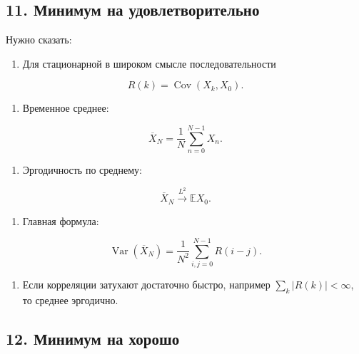 \documentclass[
  11pt,
  a4paper,
]{article}
\providecommand{\tightlist}{%
  \setlength{\itemsep}{0pt}\setlength{\parskip}{0pt}}
\begin{document}
\subsection{11. Минимум на
удовлетворительно}\label{ux43cux438ux43dux438ux43cux443ux43c-ux43dux430-ux443ux434ux43eux432ux43bux435ux442ux432ux43eux440ux438ux442ux435ux43bux44cux43dux43e}

Нужно сказать:

\begin{enumerate}
\def\labelenumi{\arabic{enumi}.}
\tightlist
\item
  Для стационарной в широком смысле последовательности
\end{enumerate}

\[
R(k)=\operatorname{Cov}(X_k,X_0).
\]

\begin{enumerate}
\def\labelenumi{\arabic{enumi}.}
\setcounter{enumi}{1}
\tightlist
\item
  Временное среднее:
\end{enumerate}

\[
\overline X_N=\frac1N\sum_{n=0}^{N-1}X_n.
\]

\begin{enumerate}
\def\labelenumi{\arabic{enumi}.}
\setcounter{enumi}{2}
\tightlist
\item
  Эргодичность по среднему:
\end{enumerate}

\[
\overline X_N\xrightarrow{L^2}\mathbb EX_0.
\]

\begin{enumerate}
\def\labelenumi{\arabic{enumi}.}
\setcounter{enumi}{3}
\tightlist
\item
  Главная формула:
\end{enumerate}

\[
\operatorname{Var}(\overline X_N)
=
\frac1{N^2}\sum_{i,j=0}^{N-1}R(i-j).
\]

\begin{enumerate}
\def\labelenumi{\arabic{enumi}.}
\setcounter{enumi}{4}
\tightlist
\item
  Если корреляции затухают достаточно быстро, например
  \(\sum_k|R(k)|<\infty\), то среднее эргодично.
\end{enumerate}

\subsection{12. Минимум на
хорошо}\label{ux43cux438ux43dux438ux43cux443ux43c-ux43dux430-ux445ux43eux440ux43eux448ux43e}
\end{document}
